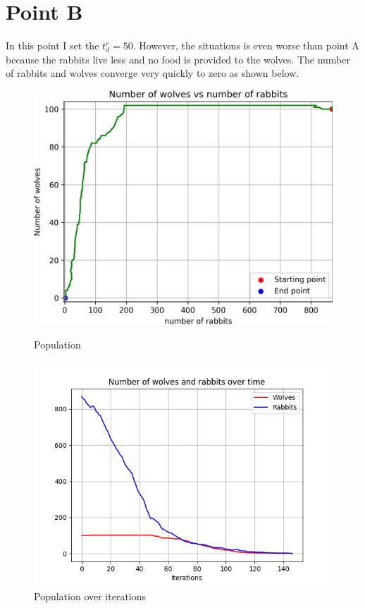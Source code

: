 \documentclass[unicode,11pt,a4paper,oneside,numbers=endperiod,openany]{scrartcl}
\begin{document}
\section*{Point B}
In this point I set the $t_d^r=50$. However, the situations is even worse than point A because the rabbits live less and no food is provided to the wolves. The number of rabbits and wolves converge very quickly to zero as shown below. 
\begin{figure}[H]
  \centering
  \begin{minipage}[b]{0.435\textwidth}
    \centering
    \includegraphics[width=\textwidth]{output_main/PointBnew_populations.png}
    \caption{Population}
  \end{minipage}
  \hfill
  \begin{minipage}[b]{0.49\textwidth}
    \centering
    \includegraphics[width=\textwidth]{output_main/PointBnew.png}
    \caption{Population over iterations}
  \end{minipage}
\end{figure}
\end{document}
